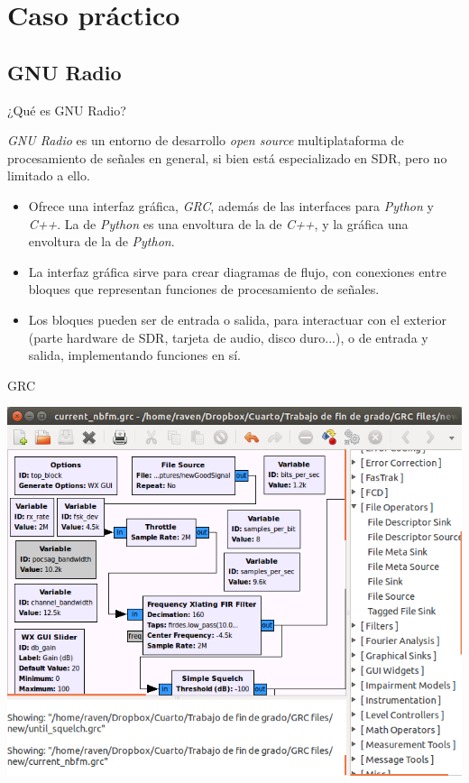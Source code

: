 \documentclass{beamer}
\begin{document}
\section{Caso práctico}

\subsection{GNU Radio}

\begin{frame}{¿Qué es GNU Radio?}

\emph{GNU Radio} es un entorno de desarrollo \emph{open source} multiplataforma de procesamiento de señales en general, si bien está especializado en SDR, pero no limitado a ello.

\begin{itemize}
	\item Ofrece una interfaz gráfica, \emph{GRC}, además de las interfaces para \emph{Python} y \emph{C++}. La de \emph{Python} es una envoltura de la de \emph{C++}, y la gráfica una envoltura de la de \emph{Python}.
	\item La interfaz gráfica sirve para crear diagramas de flujo, con conexiones entre bloques que representan funciones de procesamiento de señales.
	\item Los bloques pueden ser de entrada o salida, para interactuar con el exterior (parte hardware de SDR, tarjeta de audio, disco duro...), o de entrada y salida, implementando funciones en sí.
\end{itemize}

\end{frame}

\begin{frame}{GRC}

\begin{center}
\includegraphics[scale=0.3]{grc.png}
\end{center}

\end{frame}
\end{document}
